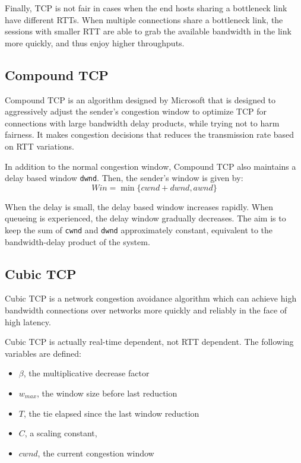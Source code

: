\documentclass[12pt,letterpaper]{book}
\theoremstyle{definition}
\begin{document}
Finally, TCP is not fair in cases when the end hosts sharing a bottleneck link have different RTTs. When multiple connections share a bottleneck link, the sessions with smaller RTT are able to grab the available bandwidth in the link more quickly, and thus enjoy higher throughputs.

\subsection{Compound TCP}

Compound TCP is an algorithm designed by Microsoft that is designed to aggressively adjust the sender's congestion window to optimize TCP for connections with large bandwidth delay products, while trying not to harm fairness. It makes congestion decisions that reduces the transmission rate based on RTT variations.

In addition to the normal congestion window, Compound TCP also maintains a delay based window \texttt{dwnd}. Then, the sender's window is given by:
\[Win = \min\{cwnd+dwnd, awnd\}\]

When the delay is small, the delay based window increases rapidly. When queueing is experienced, the delay window gradually decreases. The aim is to keep the sum of \texttt{cwnd} and \texttt{dwnd} approximately constant, equivalent to the bandwidth-delay product of the system.

\subsection{Cubic TCP}

Cubic TCP is a network congestion avoidance algorithm which can achieve high bandwidth connections over networks more quickly and reliably in the face of high latency. 

Cubic TCP is actually real-time dependent, not RTT dependent. The following variables are defined:

\begin{itemize}
  \item $\beta$, the multiplicative decrease factor
  \item $w_{max}$, the window size before last reduction
  \item $T$, the tie elapsed since the last window reduction
  \item $C$, a scaling constant,
  \item $cwnd$, the current congestion window
\end{itemize}
\end{document}
